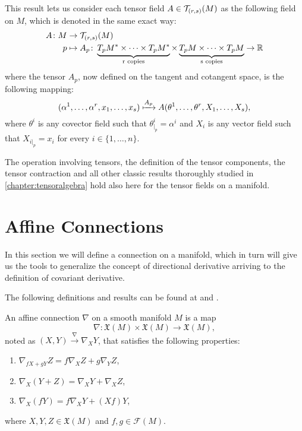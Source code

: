 This result lets us consider each tensor field $A \in {\mathcal T}_{(r,s)}(M)$ as the following field on $M$, which is denoted in the same exact way:
\begin{align*}
	A \colon M &\to {\mathcal T}_{(r,s)}(M) \\
	p &\mapsto A_p \colon \underbrace{T_p M^* \times \dots \times T_p M^*}_{\text{r copies}} \times \underbrace{T_p M \times \dots \times T_p M}_{\text{s copies}} \to \mathbb{R}
\end{align*}
where the tensor $A_p$, now defined on the tangent and cotangent space, is the following mapping:
\[
	(\alpha^1, \dots, \alpha^r, x_1, \dots, x_s) \xmapsto{A_p} A(\theta^1, \dots, \theta^r, X_1, \dots, X_s),
\]
where $\theta^i$ is any covector field such that $\theta^i_{|_p} = \alpha^i$ and $X_i$ is any vector field such that $X_{i|_p} = x_i$ for every $i \in \{1, \dots, n\}$.

The operation involving tensors, the definition of the tensor components, the tensor contraction and all other classic results thoroughly studied in \autoref{chapter:tensoralgebra}  hold also here for the tensor fields on a manifold.

\section{Affine Connections}
\label{sec:affineconnections}

In this section we will define a connection on a manifold, which in turn will give us the tools to generalize the concept of directional derivative arriving to the definition of covariant derivative.

The following definitions and results can be found at \cite[Ch. 2, Section 2]{docarmo79} and \cite[pp. 59-67]{oneill83}.

\begin{definition}
	\label{def:affineconnection}
	An affine connection $\nabla$ on a smooth manifold $M$ is a map
	\[
	\nabla \colon \mathfrak{X}(M) \times \mathfrak{X}(M) \to \mathfrak{X}(M),
	\]
	noted as $(X, Y) \xrightarrow{\nabla}\nabla_X Y$, that satisfies the following properties:
	\begin{enumerate}
		\item $\nabla_{fX + gY} Z = f\nabla_X Z + g\nabla_Y Z$,
		\item $\nabla_X(Y+Z) = \nabla_X Y + \nabla_X Z$,
		\item $\nabla_X (fY) = f\nabla_XY + (Xf) Y$,
	\end{enumerate}
	where $X,Y,Z \in \mathfrak{X}(M)$ and $f,g \in \mathcal{F}(M)$.
\end{definition}

